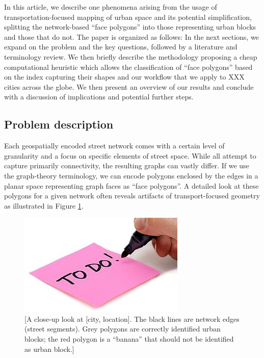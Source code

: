 In this article, we describe one phenomena arising from the usage of
transportation-focused mapping of urban space and its potential simplification,
splitting the network-based ``face polygons'' into those representing urban blocks and
those that do not. The paper is organized as follows: In the next sections, we expand
on the problem and the key questions, followed by a literature and terminology review.
We then briefly describe the methodology proposing a cheap computational heuristic
which allows the classification of ``face polygons'' based on the index capturing their
shapes and our workflow that we apply to XXX cities across the globe. We then present an
overview of our results and conclude with a discussion of implications and potential
further steps.

\subsection*{Problem description}
Each geospatially encoded street network comes with a certain level of granularity and a
focus on specific elements of street space. While all attempt to capture primarily
connectivity, the resulting graphs can vastly differ. If we use the graph-theory
terminology, we can encode polygons enclosed by the edges in a planar space representing
graph faces as ``face polygons''. A detailed look at these polygons for a given network
often reveals artifacts of transport-focused geometry as illustrated in Figure
\ref{fig:01}.

\begin{figure}
    \centering
    \includegraphics{figures/todop}
    \caption{[A close-up look at [city, location]. The black lines are network edges (street segments). Grey polygons are correctly identified urban blocks; the red polygon is a ``banana'' that should not be identified as urban block.]}
    \label{fig:01}
\end{figure}

